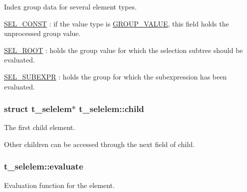 \-Index group data for several element types. 


\begin{DoxyItemize}
\item \hyperlink{selelem_8h_a1f104d5c71b1198ef51acc4ef016ae46afae2ba2c065f70efcda76e4b7a7d17d0}{\-S\-E\-L\-\_\-\-C\-O\-N\-S\-T} \-: if the value type is \hyperlink{share_2template_2gromacs_2selvalue_8h_a70b42b87d434580bf1493591857b8beca70a2af6eafa48adfab506ceee60471f6}{\-G\-R\-O\-U\-P\-\_\-\-V\-A\-L\-U\-E}, this field holds the unprocessed group value.
\item \hyperlink{selelem_8h_a1f104d5c71b1198ef51acc4ef016ae46a4374c0be00e03bae94a94c4f2d88569d}{\-S\-E\-L\-\_\-\-R\-O\-O\-T} \-: holds the group value for which the selection subtree should be evaluated.
\item \hyperlink{selelem_8h_a1f104d5c71b1198ef51acc4ef016ae46a4b01539a457afb7dbdf486c2a2e6dafb}{\-S\-E\-L\-\_\-\-S\-U\-B\-E\-X\-P\-R} \-: holds the group for which the subexpression has been evaluated. 
\end{DoxyItemize}\hypertarget{structt__selelem_aead0ea49e1e5080a07d7d95694e17f5f}{
\subsubsection[{child}]{\setlength{\rightskip}{0pt plus 5cm}struct {\bf t\-\_\-selelem}$\ast$ {\bf t\-\_\-selelem\-::child}}}\label{structt__selelem_aead0ea49e1e5080a07d7d95694e17f5f}


\-The first child element. 

\-Other children can be accessed through the {\ttfamily next} field of {\ttfamily child}. \hypertarget{structt__selelem_a5e0082a02a156c2d010414490f94d227}{
\subsubsection[{evaluate}]{ {\bf t\-\_\-selelem\-::evaluate}}}\label{structt__selelem_a5e0082a02a156c2d010414490f94d227}


\-Evaluation function for the element. 

